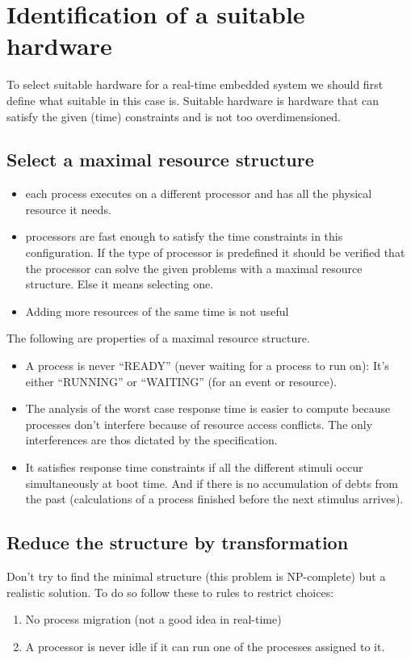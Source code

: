 \documentclass[../main.tex]{subfiles}
\begin{document}
\chapter{Identification of a suitable hardware}
To select suitable hardware for a real-time embedded system we should first define what suitable in this case is. Suitable hardware is hardware that can satisfy the given (time) constraints and is not too overdimensioned.

\section{Select a maximal resource structure}

\begin{itemize}
	\item each process executes on a different processor and has all the physical resource it needs.
	\item processors are fast enough to satisfy the time constraints in this configuration. If the type of processor is predefined it should be verified that the processor can solve the given problems with a maximal resource structure. Else it means selecting one.
	\item Adding more resources of the same time is not useful
\end{itemize}

The following are properties of a maximal resource structure.
\begin{itemize}
	\item A process is never ``READY'' (never waiting for a process to run on): It's either ``RUNNING'' or ``WAITING'' (for an event or resource).
	\item The analysis of the worst case response time is easier to compute because processes don't interfere because of resource access conflicts. The only interferences are thos dictated by the specification.
	\item It satisfies response time constraints if all the different stimuli occur simultaneously at boot time. And if there is no accumulation of debts from the past (calculations of a process finished before the next stimulus arrives).
\end{itemize}

\section{Reduce the structure by transformation}
Don't try to find the minimal structure (this problem is NP-complete) but a realistic solution. 
To do so follow these to rules to restrict choices:
\begin{enumerate}
	\item No process migration (not a good idea in real-time)
	\item A processor is never idle if it can run one of the processes assigned to it.
\end{enumerate}
\end{document}
